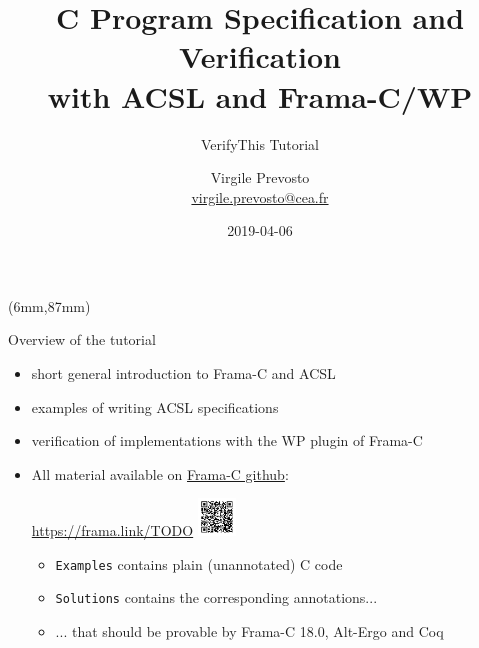 \documentclass[pdf,xcolor={svgnames}]{beamer}
\author{Virgile Prevosto\\
\href{mailto:virgile.prevosto@cea.fr}{virgile.prevosto@cea.fr}}
\institute{CEA Tech List}
\title{C Program Specification and Verification\\ with ACSL and Frama-C/WP}
\subtitle{VerifyThis Tutorial}
\date{2019-04-06}
\begin{document}
\begin{frame}\maketitle
\begin{textblock*}{1.5cm}(6mm,87mm)
\doclicenseImage[imagewidth=8mm]
\end{textblock*}
\end{frame}

\begin{frame}{Overview of the tutorial}
\begin{itemize}
\item short general introduction to Frama-C and ACSL
\item examples of writing ACSL specifications
\item verification of implementations with the WP plugin of Frama-C
\item All material available on \href{https://github.com/Frama-C/open-source-case-studies/tree/master/tutorials/2019-04-VerifyThis}{Frama-C github}:
\begin{center}
\url{https://frama.link/TODO}\hspace{5mm}
\includegraphics[width=1cm,align=c]{tuto-qr.pdf}
\end{center}
\begin{itemize}
\item \alert{\texttt{Examples}} contains plain (unannotated) C code
\item \alert{\texttt{Solutions}} contains the corresponding annotations...
\item ... that should be provable by Frama-C 18.0, Alt-Ergo and Coq
\end{itemize}
\end{itemize}
\end{frame}
\end{document}
